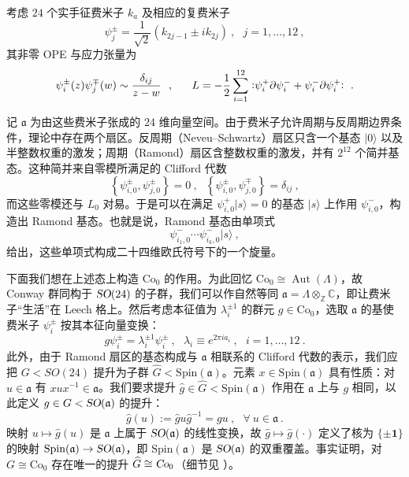 \documentclass[11pt,a4paper,fontset=windows]{ctexart}
\numberwithin{equation}{section}
\newcommand{\SO}{\operatorname{\textsl{SO}}}      %
\newcommand{\Co}{\operatorname{\textsl{Co}}}      %
\newcommand{\Aut}{\operatorname{\text{Aut}}}      %
\newcommand{\normord}[1]{\vcentcolon\mathrel{#1}\vcentcolon}
\begin{document}
考虑 $24$ 个实手征费米子 $k_a$ 及相应的复费米子
\begin{equation}
\psi^\pm_j=\frac{1}{\sqrt{2}}\left(k_{2j-1}\pm ik_{2j}\right)~,~~~j=1,\dots,12~, 
\end{equation}
其非零 OPE 与应力张量为
\begin{equation}
\psi^\pm_i(z)\psi^\mp_j(w)\sim\frac{\delta_{ij}}{z-w}~~,~~~~~L=-\frac{1}{2}\sum_{i=1}^{12}\normord{\psi_i^+\partial\psi_i^- + \psi_i^-\partial\psi_i^+}~.
\end{equation}


记 $\mathfrak{a}$ 为由这些费米子张成的 $24$ 维向量空间。由于费米子允许周期与反周期边界条件，理论中存在两个扇区。反周期（Neveu–Schwartz）扇区只含一个基态 $|0\rangle$ 以及半整数权重的激发；周期（Ramond）扇区含整数权重的激发，并有 $2^{12}$ 个简并基态。这种简并来自零模所满足的 Clifford 代数
\begin{equation}
\left\lbrace\psi^\pm_{i,0},\psi^\pm_{j,0}\right\rbrace=0~,~~~\left\lbrace\psi^\pm_{i,0},\psi^\mp_{j,0}\right\rbrace=\delta_{ij}~,
\end{equation}
而这些零模还与 $L_0$ 对易。于是可以在满足 $\psi^+_{i,0}|s\rangle=0$ 的基态 $|s\rangle$ 上作用 $\psi^-_{i,0}$，构造出 Ramond 基态。也就是说，Ramond 基态由单项式
\begin{equation}
\label{eq:conway_mononomials}
\psi^-_{i_1,0}\cdots\psi^-_{i_k,0}|s\rangle~,
\end{equation}
给出，这些单项式构成二十四维欧氏符号下的一个旋量。


下面我们想在上述态上构造 $\text{Co}_0$ 的作用。为此回忆 $\text{Co}_0\cong\Aut(\Lambda)$，故 Conway 群同构于 $\SO(24)$ 的子群，我们可以作自然等同 $\mathfrak{a}=\Lambda\otimes_\mathbb{Z}\mathbb{C}$，即让费米子“生活”在 Leech 格上。然后考虑本征值为 $\lambda_i^{\pm1}$ 的群元 $g\in\text{Co}_0$，选取 $\mathfrak{a}$ 的基使费米子 $\psi^\pm_i$ 按其本征向量变换：
\begin{equation}
\label{eq:conway_action_fermions}
g\psi^\pm_i=\lambda_i^{\pm1}\psi^\pm_i~,~~~\lambda_i\equiv e^{2\pi ia_i}~,~~~i=1,\dots,12~.
\end{equation}
此外，由于 Ramond 扇区的基态构成与 $\mathfrak{a}$ 相联系的 Clifford 代数的表示，我们应把 $G<SO(24)$ 提升为子群 $\widehat{G}<\text{Spin}(\mathfrak{a})$。元素 $x\in\text{Spin}(\mathfrak{a})$ 具有性质：对 $u\in\mathfrak{a}$ 有 $xux^{-1}\in\mathfrak{a}$。我们要求提升 $\hat{g}\in\widehat{G}<\text{Spin}(\mathfrak{a})$ 作用在 $\mathfrak{a}$ 上与 $g$ 相同，以此定义 $g\in G<\SO(\mathfrak{a})$ 的提升：
\begin{equation}
\label{lift_def}
\hat{g}(u):=\hat{g}u\hat{g}^{-1}=gu
~,~~~\forall~u\in\mathfrak{a}~.
\end{equation}
映射 $u\mapsto\hat{g}(u)$ 是 $\mathfrak{a}$ 上属于 $\SO(\mathfrak{a})$ 的线性变换，故 $\hat{g}\mapsto\hat{g}(\cdot)$ 定义了核为 $\lbrace\pm\mathbf{1}\rbrace$ 的映射 $\text{Spin}(\mathfrak{a})\rightarrow\SO(\mathfrak{a})$，即 $\text{Spin}(\mathfrak{a})$ 是 $\SO(\mathfrak{a})$ 的双重覆盖。事实证明，对 $G\cong\text{Co}_0$ 存在唯一的提升 $\widehat{G}\cong\Co_0$（细节见 \cite{DuncanJohnf.r.2015TMMF}）。
\end{document}
